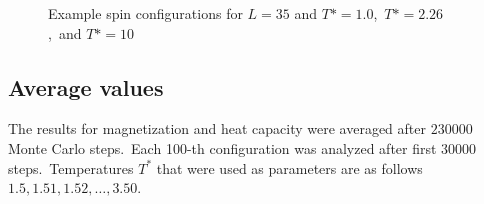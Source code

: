 \documentclass[11pt]{article}
\begin{document}
    \begin{figure}[H]
        \centering
        \caption{Example spin configurations for $L = 35$ and $T* = 1.0$,\ $T* = 2.26$,\ and $T* = 10$ }
        \label{fig:tird}
    \end{figure}


    \subsection{Average values}
    \label{subsec:average-values}

    The results for magnetization and heat capacity were averaged after $230 000$ Monte Carlo
    steps.\ Each 100-th configuration was analyzed after first $30 000$ steps.\ Temperatures $T^*$
    that were used as parameters are as follows $1.5, 1.51, 1.52, \ldots, 3.50$.
\end{document}
